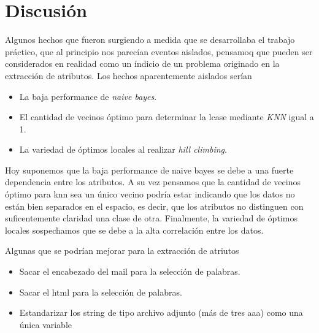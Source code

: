 \documentclass[a4paper,10pt]{article}
\begin{document}
\section{Discusi\'on}

Algunos hechos que fueron surgiendo a medida que se desarrollaba el trabajo pr\'actico, que al principio nos parec\'ian eventos aislados, pensamoq que pueden ser considerados en realidad como un \'indicio de un problema originado en la extracci\'on de atributos. Los hechos aparentemente aislados ser\'ian

\begin{itemize}
 \item La baja performance de \emph{naive bayes}. 
 \item El cantidad de vecinos \'optimo para determinar la lcase mediante \emph{KNN} igual a 1. 
 \item La variedad de \'optimos locales al realizar \emph{hill climbing}. 
\end{itemize}

Hoy suponemos que la baja performance de naive bayes se debe a una fuerte dependencia entre los atributos. A su vez pensamos que la cantidad de vecinos \'optimo para knn sea un \'unico vecino podr\'ia estar indicando que los datos no est\'an bien separados en el espacio, es decir, que los atributos no distinguen con suficentemente claridad una clase de otra. Finalmente, la variedad de \'optimos locales sospechamos que se debe a la alta correlaci\'on entre los datos. 

Algunas que se podr\'ian mejorar para la extracci\'on de atriutos 

\begin{itemize}
 \item Sacar el encabezado del mail para la selecci\'on de palabras. 
 \item Sacar el html para la selecci\'on de palabras. 
 \item Estandarizar los string de tipo archivo adjunto (m\'as de tres aaa) como una \'unica variable 
\end{itemize}




\scriptsize


\end{document}
